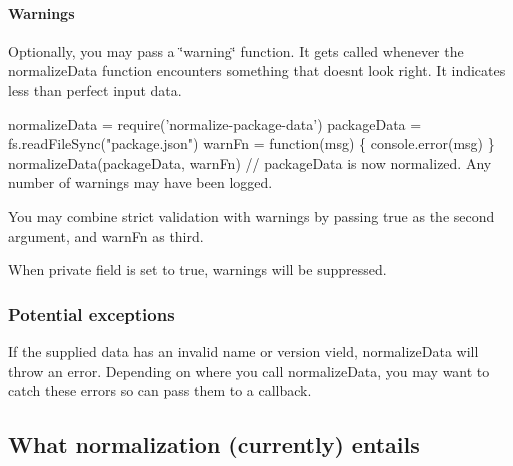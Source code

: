 \paragraph*{Warnings}

Optionally, you may pass a \char`\"{}warning\char`\"{} function. It gets called whenever the {\ttfamily normalize\+Data} function encounters something that doesn\textquotesingle{}t look right. It indicates less than perfect input data.


\begin{DoxyCode}
normalizeData = require('normalize-package-data')
packageData = fs.readFileSync("package.json")
warnFn = function(msg) \{ console.error(msg) \}
normalizeData(packageData, warnFn)
// packageData is now normalized. Any number of warnings may have been logged.
\end{DoxyCode}


You may combine strict validation with warnings by passing {\ttfamily true} as the second argument, and {\ttfamily warn\+Fn} as third.

When {\ttfamily private} field is set to {\ttfamily true}, warnings will be suppressed.

\subsubsection*{Potential exceptions}

If the supplied data has an invalid name or version vield, {\ttfamily normalize\+Data} will throw an error. Depending on where you call {\ttfamily normalize\+Data}, you may want to catch these errors so can pass them to a callback.

\subsection*{What normalization (currently) entails}


